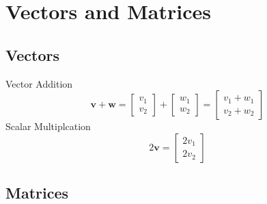\section{Vectors and Matrices}
    
    \subsection{Vectors}
        Vector Addition
        \begin{equation}
            \boldsymbol{v} + \boldsymbol{w} = 
            \begin{bmatrix}
                v_1 \\
                v_2
            \end{bmatrix}
            +
            \begin{bmatrix}
                w_1 \\
                w_2
            \end{bmatrix}
            =
            \begin{bmatrix}
                v_1 + w_1 \\
                v_2 + w_2
            \end{bmatrix}
        \end{equation}
        Scalar Multiplcation
        \begin{equation}
            2\boldsymbol{v} = 
            \begin{bmatrix}
                2v_1 \\
                2v_2
            \end{bmatrix}
        \end{equation}

    \subsection{Matrices}

